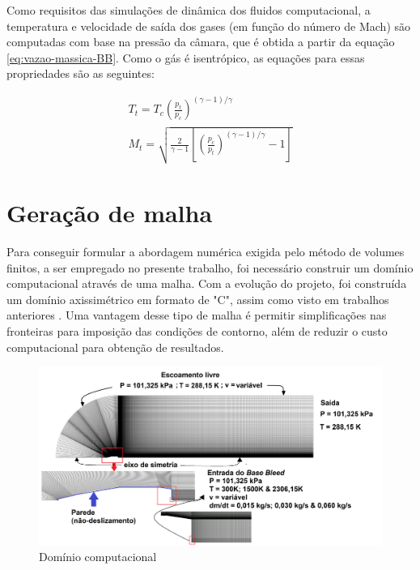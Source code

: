 Como requisitos das simulações de dinâmica dos fluidos computacional, a temperatura e velocidade de saída dos gases (em função do número de Mach) são computadas com base na pressão da câmara, que é obtida a partir da equação \ref{eq:vazao-massica-BB}. Como o gás é isentrópico, as equações para essas propriedades são as seguintes:

\begin{align}
    \label{eq:temperatura-BB}
    T_{t} = T_{c}\left(\frac{p_t}{p_c}\right)^{(\gamma - 1)/\gamma} \\
    \label{eq:velocidade-mach-BB}
    M_{t} = \sqrt{\frac{2}{\gamma - 1}\left[\left(\frac{p_c}{p_t}\right)^{(\gamma - 1)/\gamma}-1\right]}
\end{align}

\section{Geração de malha}\label{sec:geracao-malha}

Para conseguir formular a abordagem numérica exigida pelo método de volumes finitos, a ser empregado no presente trabalho, foi necessário construir um domínio computacional através de uma malha. Com a evolução do projeto, foi construída um domínio axissimétrico em formato de "C", assim como visto em trabalhos anteriores \cite{Mahmoud2009,nicolas-perez_accuracy_2017}. Uma vantagem desse tipo de malha é permitir simplificações nas fronteiras para imposição das condições de contorno, além de reduzir o custo computacional para obtenção de resultados.

\begin{figure}[!ht]
	\centering
	\includegraphics[width=1.0\textwidth]{foto01-malha.png}
	\caption{Domínio computacional}
	\label{fig12:autor-malha}
\end{figure}


